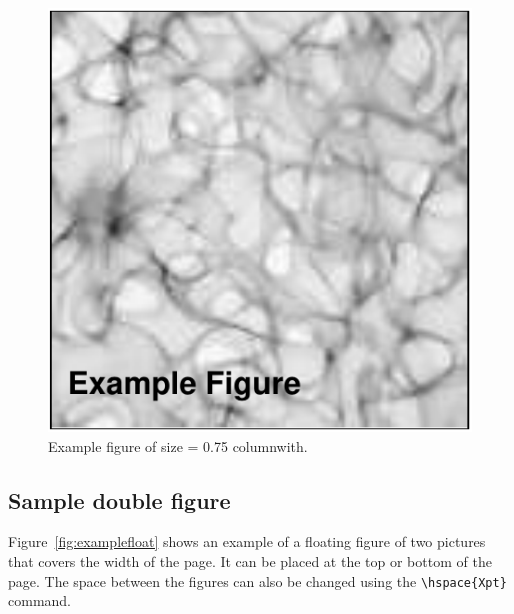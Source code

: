 \documentclass[11pt,proc,twoside]{RMxAC_rho-class/RMxAC_rho}
\begin{document}
            \begin{figure}[ht]
                \centering
                \includegraphics[width=0.75\columnwidth]{figures/example-fig.pdf}
                \caption{Example figure of size = 0.75 columnwith.}
                \label{fig:figure}
            \end{figure}

    \subsection{Sample double figure}

        Figure~\ref{fig:examplefloat} shows an example of a floating figure of two pictures that covers the width of the page. It can be placed at the top or bottom of the page. The space between the figures can also be changed using the \verb|\hspace{Xpt}| command.
\end{document}
